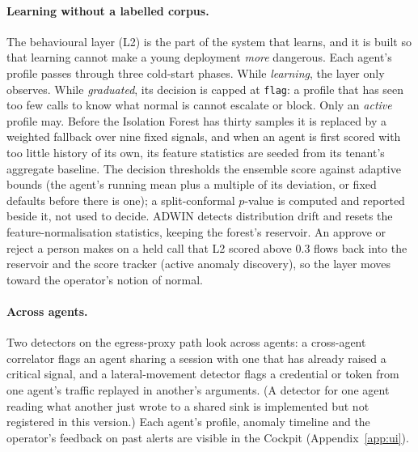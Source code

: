 \paragraph{Learning without a labelled corpus.}
The behavioural layer (L2) is the part of the system that learns, and it
is built so that learning cannot make a young deployment \emph{more}
dangerous. Each agent's profile passes through three cold-start phases.
While \emph{learning}, the layer only observes. While \emph{graduated},
its decision is capped at \texttt{flag}: a profile that has seen too few
calls to know what normal is cannot escalate or block. Only an
\emph{active} profile may. Before the Isolation Forest has thirty samples
it is replaced by a weighted fallback over nine fixed signals, and when an agent is first scored with too little history of its own, its feature statistics are seeded from its tenant's aggregate baseline. The decision thresholds the ensemble score against adaptive bounds (the agent's running mean plus a multiple of its deviation, or fixed defaults before there is one); a split-conformal $p$-value is computed and reported beside it, not used to decide. ADWIN detects distribution drift and resets the feature-normalisation statistics, keeping the forest's reservoir. An approve or reject a person makes on a held call that L2 scored above 0.3 flows back into the reservoir and the score tracker (active anomaly discovery), so the layer moves toward the operator's notion of normal.

\paragraph{Across agents.}
Two detectors on the egress-proxy path look across agents: a cross-agent correlator flags an agent sharing a session with one that has already raised a critical signal, and a lateral-movement detector flags a credential or token from one agent's traffic replayed in another's arguments. (A detector for one agent reading what another just wrote to a shared sink is implemented but not registered in this version.) Each agent's
profile, anomaly timeline and the operator's feedback on past alerts are
visible in the Cockpit (Appendix~\ref{app:ui}).
